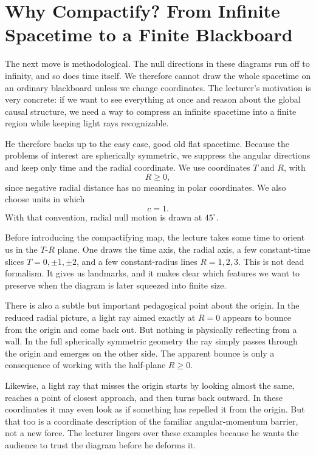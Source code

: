 \section{Why Compactify? From Infinite Spacetime to a Finite Blackboard}

The next move is methodological. The null directions in these diagrams run off to infinity, and so does time itself. We therefore cannot draw the whole spacetime on an ordinary blackboard unless we change coordinates. The lecturer's motivation is very concrete: if we want to see everything at once and reason about the global causal structure, we need a way to compress an infinite spacetime into a finite region while keeping light rays recognizable.

He therefore backs up to the easy case, good old flat spacetime. Because the problems of interest are spherically symmetric, we suppress the angular directions and keep only time and the radial coordinate. We use coordinates \(T\) and \(R\), with
\[
R\ge 0,
\]
since negative radial distance has no meaning in polar coordinates. We also choose units in which
\[
c=1.
\]
With that convention, radial null motion is drawn at \(45^\circ\).

Before introducing the compactifying map, the lecture takes some time to orient us in the \(T\)-\(R\) plane. One draws the time axis, the radial axis, a few constant-time slices \(T=0,\pm1,\pm2\), and a few constant-radius lines \(R=1,2,3\). This is not dead formalism. It gives us landmarks, and it makes clear which features we want to preserve when the diagram is later squeezed into finite size.

There is also a subtle but important pedagogical point about the origin. In the reduced radial picture, a light ray aimed exactly at \(R=0\) appears to bounce from the origin and come back out. But nothing is physically reflecting from a wall. In the full spherically symmetric geometry the ray simply passes through the origin and emerges on the other side. The apparent bounce is only a consequence of working with the half-plane \(R\ge 0\).

Likewise, a light ray that misses the origin starts by looking almost the same, reaches a point of closest approach, and then turns back outward. In these coordinates it may even look as if something has repelled it from the origin. But that too is a coordinate description of the familiar angular-momentum barrier, not a new force. The lecturer lingers over these examples because he wants the audience to trust the diagram before he deforms it.

